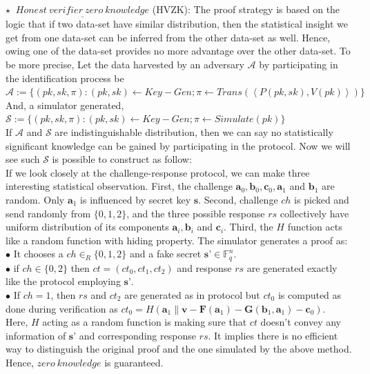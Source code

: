 \documentclass{article}
\begin{document}
$\star\ $ $\underline{Honest\ verifier\ zero\ knowledge}$ (HVZK): The proof strategy is based on the logic that if two data-set have similar distribution, then the statistical insight we get from one data-set can be inferred from the other data-set as well. Hence, owing one of the data-set provides no more advantage over the other data-set. To be more precise, Let the data harvested by an adversary $\mathcal{A}$ by participating in the identification process be\\
$\mathcal{A} := \{(pk, sk, \pi): (pk,sk)\leftarrow Key-Gen; \pi\leftarrow Trans(\left\langle P(pk,sk),V(pk)\right\rangle)\}$\\
And, a simulator generated, $\mathcal{S} := \{(pk, sk, \pi): (pk,sk)\leftarrow Key-Gen; \pi\leftarrow Simulate(pk)\}$\\
If $\mathcal{A}$ and $\mathcal{S}$ are indistinguishable distribution, then we can say no statistically significant knowledge can be gained by participating in the protocol. Now we will see such $\mathcal{S}$ is possible to construct as follow:\\
If we look closely at the challenge-response protocol, we can make three interesting statistical observation. First, the challenge $\textbf{a}_0, \textbf{b}_0, \textbf{c}_0, \textbf{a}_1 $ and $ \textbf{b}_1$ are random. Only $\textbf{a}_1$ is influenced by secret key $\textbf{s}$. Second, challenge $ch$ is picked and send randomly from $\{0,1,2\}$, and the three possible response $rs$ collectively have uniform distribution of its components $\textbf{a}_i, \textbf{b}_i$ and $ \textbf{c}_i$. Third, the $H$ function acts like a random function with hiding property. The simulator generates a proof as:\\
$\bullet$ It chooses a $ch \in_R \{0,1,2\}$ and a fake secret $\textbf{s'} \in \mathbb{F}^n _q$.\\
$\bullet$ if $ch \in \{0,2\}$ then $ct = (ct_0, ct_1, ct_2)$ and response $rs$ are generated exactly like the protocol employing $\textbf{s'}$.\\
$\bullet$ If $ch =1$, then $rs$ and $ct_2$ are generated as in protocol but $ct_0$ is computed as done during verification as $ct_0= H(\textbf{a}_1 \parallel \textbf{v}- \textbf{F}(\textbf{a}_1) - \textbf{G}(\textbf{b}_1, \textbf{a}_1) -\textbf{c}_0)$.\\
Here, $H$ acting as a random function is making sure that $ct$ doesn't convey any information of $\textbf{s'}$ and corresponding response $rs$. It implies there is no efficient way to distinguish the original proof and the one simulated by the above method. Hence, $zero\ knowledge$ is guaranteed.\\
\end{document}
